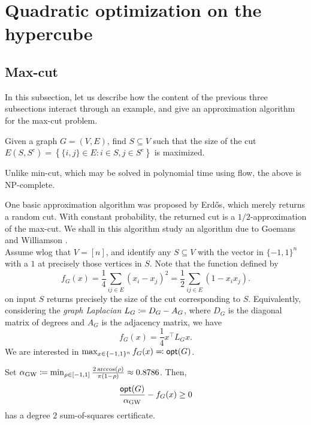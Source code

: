 
\section{Quadratic optimization on the hypercube}

\subsection{Max-cut}

	In this subsection, let us describe how the content of the previous three subsections interact through an example, and give an approximation algorithm for the max-cut problem.

	\begin{question*}
		Given a graph $G = (V,E)$, find $S \subseteq V$ such that the size of the cut $E(S,S^c) = \left\{ \{i,j\} \in E : i \in S, j \in S^c \right\}$ is maximized.
	\end{question*}

	Unlike min-cut, which may be solved in polynomial time using flow, the above is \textsf{NP}-complete.

	One basic approximation algorithm was proposed by Erd\H{o}s, which merely returns a random cut. With constant probability, the returned cut is a $1/2$-approximation of the max-cut. We shall in this algorithm study an algorithm due to Goemans and Williamson \cite{gw-maxcut}.\\
	Assume wlog that $V = [n]$, and identify any $S \subseteq V$ with the vector in $\{-1,1\}^n$ with a $1$ at precisely those vertices in $S$. Note that the function defined by
	\[ f_G(x) = \frac{1}{4} \sum_{ij \in E} (x_i - x_j)^2 = \frac{1}{2} \sum_{ij \in E} (1 - x_ix_j). \]
	on input $S$ returns precisely the size of the cut corresponding to $S$. Equivalently, considering the \emph{graph Laplacian} $L_G \coloneqq D_G - A_G$, where $D_G$ is the diagonal matrix of degrees and $A_G$ is the adjacency matrix, we have
	\begin{equation}
		\label{eqn: gw-lapl}
		f_G(x) = \frac{1}{4} x^\top L_G x.
	\end{equation}
	We are interested in $\max_{x \in \{-1,1\}^n} f_G(x) \eqqcolon \mathsf{opt}(G)$.

	\begin{ftheo}
		\label{theo: gw-sos}
		Set $\alpha_{\text{GW}} \coloneqq \min_{\rho \in [-1,1]} \frac{2\arccos(\rho)}{\pi(1-\rho)} \approx 0.8786$. Then,
		\[ \frac{\mathsf{opt}(G)}{\alpha_{\text{GW}}} - f_G(x) \ge 0 \]
		has a degree $2$ sum-of-squares certificate.
	\end{ftheo}

